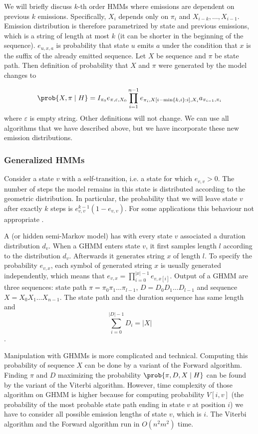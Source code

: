\nocite{Brejova2005,Alexanderson2004}
We will briefly discuss $k$-th order HMMs where emissions are dependent on
previous $k$ emissions. Specifically, $X_i$ depends only on $\pi_i$ and
$X_{i-k},\dots,X_{i-1}$. Emission distribution is therefore parametrized by
state and previous emissions, which is a string of length at most $k$ (it can be
shorter in the beginning of the sequence). $e_{u,x,a}$ is probability that
state $u$ emits $a$ under the condition that $x$ is the suffix of the already emitted
sequence. Let $X$ be sequence and $\pi$ be state path. Then definition
of probability that $X$ and $\pi$ were generated by the model changes to

\[
\prob{X,\pi\mid H} = 
I_{\pi_0}e_{\pi,\varepsilon,X_0}\prod_{i=1}^{n-1}
e_{\pi_i,X[i-\min\{k,i\}:i],X_i}a_{\pi_{i-1},\pi_i}
\]
where $\varepsilon$ is empty string. Other definitions will not change. We can
use all algorithms that we have described above, but we have incorporate these
new emission distributions.

\subsubsection{Generalized HMMs}

Consider a state $v$ with a self-transition, i.e. a state for which $e_{v,v}>0$.
The number of steps the model remains in this state is distributed according to
the geometric distribution.
In particular, the probability that we will leave state $v$ after exactly $k$ steps is
$e_{v,v}^{k-1}(1-e_{v,v})$. For some
applications this behaviour not
appropriate \cite{Burge1997,Majoros2004}.

A  (or hidden semi-Markov model)
has with every state $v$ associated a duration distribution $d_v$.  When
a GHMM enters state $v$, it first samples length $l$ according
to the distribution $d_v$.  Afterwards it generates string $x$ of length $l$.  To
specify the probability $e_{v,x}$, each symbol of generated string $x$ is usually
generated independently, which means that $e_{v,x}=\prod_{i=0}^{|x|-1}e_{v,x[i]}$.
Output of a GHMM are three sequences: state path $\pi=\pi_0\pi_1\dots\pi_{l-1}$,
 $D=D_0D_1\dots D_{l-1}$ and sequence
$X=X_0X_1\dots X_{n-1}$.  The state path and the duration sequence has same
length and \[\sum_{i=0}^{|D|-1}D_i = |X|\].

Manipulation with GHMMs is  more complicated and technical.
Computing this probability of sequence $X$ can be done by a variant of the
Forward algorithm. Finding $\pi$ and $D$ maximizing the probability
$\prob{\pi,D,X\mid H}$ can be found by the variant of the Viterbi algorithm.
However, time complexity of those algorithm on GHMM is higher because for
computing probability $V[i, v]$ (the probability of the most probable state
path ending in state $v$ at position $i$) we have to consider all possible
emission lengths of state $v$, which is $i$. The Viterbi algorithm and the
Forward algorithm run in $O(n^2m^2)$ time.


